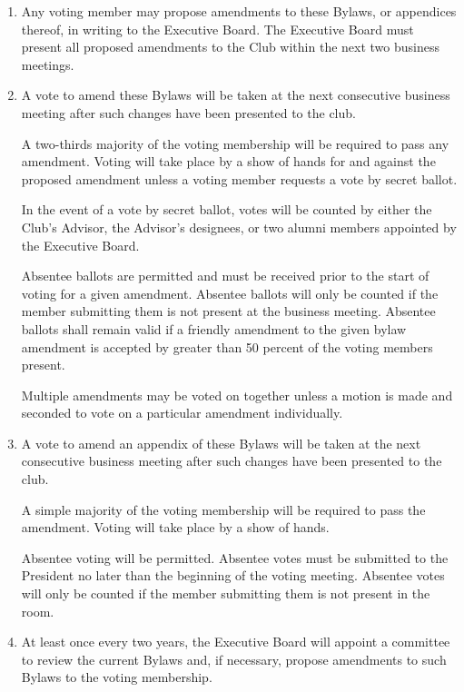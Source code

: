 \documentclass[12pt,letterpaper,oneside]{book}
\begin{document}
\begin{enumerate}

\item Any voting member may propose amendments to these Bylaws, or appendices thereof, in writing to the Executive Board. The Executive Board must present all proposed amendments to the Club within the next two business meetings.

\item A vote to amend these Bylaws will be taken at the next consecutive business meeting after such changes have been presented to the club.

\subitem A two-thirds majority of the voting membership will be required to pass any amendment. Voting will take place by a show of hands for and against the proposed amendment unless a voting member requests a vote by secret ballot.

\subitem In the event of a vote by secret ballot, votes will be counted by either the Club’s Advisor, the Advisor’s designees, or two alumni members appointed by the Executive Board.

\subitem Absentee ballots are permitted and must be received prior to the start of voting for a given amendment. Absentee ballots will only be counted if the member submitting them is not present at the business meeting. Absentee ballots shall remain valid if a friendly amendment to the given bylaw amendment is accepted by greater than 50 percent of the voting members present.

\subitem Multiple amendments may be voted on together unless a motion is made and seconded to vote on a particular amendment individually. 

\item A vote to amend an appendix of these Bylaws will be taken at the next consecutive business meeting after such changes have been presented to the club.

\subitem A simple majority of the voting membership will be required to pass the amendment. Voting will take place by a show of hands.

\subitem Absentee voting will be permitted. Absentee votes must be submitted to the President no later than the beginning of the voting meeting. Absentee votes will only be counted if the member submitting them is not present in the room.

\item At least once every two years, the Executive Board will appoint a committee to review the current Bylaws and, if necessary, propose amendments to such Bylaws to the voting membership.

\end{enumerate}
\end{document}

